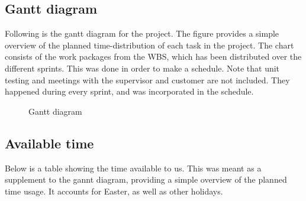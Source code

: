 \subsection{Gantt diagram}
\label{subsec:process_and_methodology-resource_management-gantt_diagram}

Following is the gantt diagram for the project. The figure provides a simple overview of the planned time-distribution of each task in the project. The chart consists of the work packages from the WBS, which has been distributed over the different sprints. This was done in order to make a schedule. Note that unit testing and meetings with the supervisor and customer are not included. They happened during every sprint, and was incorporated in the schedule.

\begin{center}
  \begin{figure}[ht!]
    \caption{Gantt diagram}
    \label{fig:gantt}
  \end{figure}
\end{center}

\clearpage

\subsection{Available time}
\label{subsec:process_and_methodology-resource_management-available_time}

Below is a table showing the time available to us. This was meant as a supplement to the gannt diagram, providing a simple overview of the planned time usage. It accounts for Easter, as well as other holidays.

